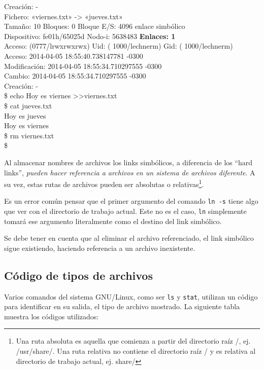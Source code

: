 \documentclass[12pt]{article}
\begin{document}
{{{    Creación: - \\
  Fichero: «viernes.txt» -> «jueves.txt» \\
  Tamaño: 10        	Bloques: 0          Bloque E/S: 4096   enlace simbólico \\
Dispositivo: fe01h/65025d	Nodo-i: 5638483     \textbf{Enlaces: 1} \\
Acceso: (0777/lrwxrwxrwx)  Uid: ( 1000/lechnerm)   Gid: ( 1000/lechnerm) \\
      Acceso: 2014-04-05 18:55:40.738147781 -0300 \\
Modificación: 2014-04-05 18:55:34.710297555 -0300 \\
      Cambio: 2014-04-05 18:55:34.710297555 -0300 \\
    Creación: - \\
\$ echo Hoy es viernes \textgreater \textgreater viernes.txt  \\
\$ cat jueves.txt  \\
Hoy es jueves \\
Hoy es viernes \\
\$ rm viernes.txt  \\
\$  \\
}

\vspace*{0.4cm} } }

Al almacenar nombres de archivos los links simbólicos, a diferencia de los ``hard 
links'', \textit{pueden hacer referencia a archivos en un sistema de archivos diferente}. A su 
vez, estas rutas de archivos pueden ser absolutas o relativas\footnote{Una ruta absoluta
es aquella que comienza a partir del directorio raíz /, ej. /usr/share/. Una ruta relativa
no contiene el directorio raíz / y es relativa al directorio de trabajo actual, ej. share/}. 

Es un error común pensar que el primer argumento del comando \texttt{ln -s} tiene algo que 
ver con el directorio de trabajo actual. Este no es el caso, \texttt{ln} simplemente tomará 
ese argumento literalmente como el destino del link simbólico. 

Se debe tener en cuenta que al eliminar el archivo referenciado, el link simbólico sigue existiendo, 
haciendo referencia a un archivo inexistente. 

\subsection*{Código de tipos de archivos}
Varios comandos del sistema GNU/Linux, como ser \texttt{ls} y \texttt{stat}, utilizan un código 
para identificar en su salida, el tipo de archivo mostrado. La siguiente tabla muestra los 
códigos utilizados:
\end{document}
